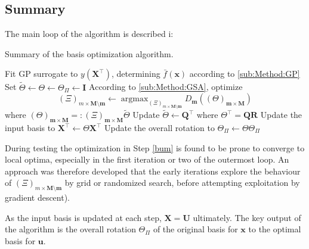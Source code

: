 \documentclass[preprint,12pt]{elsarticle}
\newcommand*{\M}[1]{\ensuremath{#1}\xspace}
\newcommand*{\vr}[1]{\M{\mathbf{#1}}}
\newcommand*{\deqr}{\M{=\mathrel{\mathop:}}}
\DeclareMathOperator*{\argmax}{argmax}
\begin{document}
        \subsection{Summary} \label{sub:Method:Summary}
            The main loop of the algorithm is described i:
            
            \begin{algorithm}
            \caption{Summary of the basis optimization algorithm.}
                \begin{algorithmic}[1]
                    \REPEAT
                        \STATE Fit GP surrogate to $y(\vr{X}^{\intercal})$, determining $\bar{f}(\vr{x})$ according to \cref{sub:Method:GP}
                        \STATE Set $\tilde{\Theta} \leftarrow \Theta \leftarrow \Theta_{\Pi} \leftarrow \vr{I}$
                            \STATE According to \cref{sub:Method:GSA}, optimize \label{bum}
                            $$(\Xi)_{m\times\vr{M}\setminus\vr{m}} \leftarrow \argmax_{(\Xi)_{m\times\vr{M}\setminus\vr{m}}} D_{\vr{m}}((\Theta)_{\vr{m}\times\vr{M}})$$
                            where $(\Theta)_{\vr{m}\times\vr{M}} \deqr (\Xi)_{\vr{m}\times\vr{M}} \tilde{\Theta}$
                            \STATE  Update $\tilde{\Theta} \leftarrow \vr{Q}^{\intercal}$ where $\Theta^{\intercal} = \vr{Q}\vr{R}$
                        \ENDFOR
                        \STATE Update the input basis to $\vr{X}^{\intercal} \leftarrow \Theta \vr{X}^{\intercal}$
                        \STATE Update the overall rotation to $\Theta_{\Pi} \leftarrow \Theta \Theta_{\Pi}$
                    \UNTIL{$\Theta \approx \vr{I}$}
                \end{algorithmic}
            \end{algorithm}

            During testing the optimization in Step \ref{bum} is found to be prone to converge to local optima, especially in the first iteration or two of the outermost loop. An approach was therefore developed that the early iterations explore the behaviour of \M{(\Xi)_{m\times\vr{M}\setminus\vr{m}}} by grid or randomized search, before attempting exploitation by gradient descent).

            As the input basis is updated at each step, \M{\vr{X} = \vr{U}} ultimately. 
            The key output of the algorithm is the overall rotation \M{\Theta_{\Pi}} of the original basis for \vr{x} to the optimal basis for \vr{u}.
                       
\end{document}
